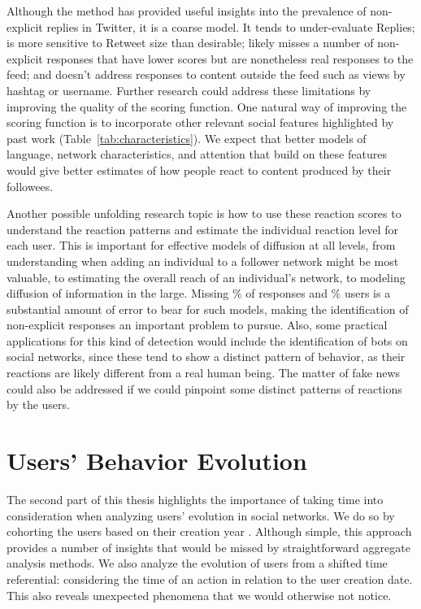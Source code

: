 Although the method has provided useful insights into the prevalence of non-explicit replies in Twitter, it is a coarse model.  It tends to under-evaluate Replies; is more sensitive to Retweet size than desirable; likely misses a number of non-explicit responses that have lower scores but are nonetheless real responses to the feed; and doesn't address responses to content outside the feed such as views by hashtag or username. Further research could address these limitations by improving the quality of the scoring function.  One natural way of improving the scoring function is to incorporate other relevant social features highlighted by past work (Table~\ref{tab:characteristics}).  We expect that better models of language, network characteristics, and attention that build on these features would give better estimates of how people react to content produced by their followees. 

Another possible unfolding research topic is how to use these reaction scores to understand the reaction patterns and estimate the individual reaction level for each user.  This is important for effective models of diffusion at all levels, from understanding when adding an individual to a follower network might be most valuable, to estimating the overall reach of an individual's network, to modeling diffusion of information in the large.  Missing \highNonTaggedTweetCountPct{}\% of responses and \usersAboveLinePct{}\% users is a substantial amount of error to bear for such models, making the identification of non-explicit responses an important problem to pursue. Also, some practical applications for this kind of detection would include the identification of bots on social networks, since these tend to show a distinct pattern of behavior, as their reactions are likely different from a real human being. The matter of fake news could also be addressed if we could pinpoint some distinct patterns of reactions by the users.


\section{Users' Behavior Evolution}

The second part of this thesis highlights the importance of taking time into consideration when analyzing users' evolution in social networks. We do so by cohorting the users based on their creation year \cite{Barbosa2016}. Although simple, this approach provides a number of insights that would be missed by straightforward aggregate analysis methods.  We also analyze the evolution of users from a shifted time referential: considering the time of an action in relation to the user creation date. This also reveals unexpected phenomena that we would otherwise not notice.

